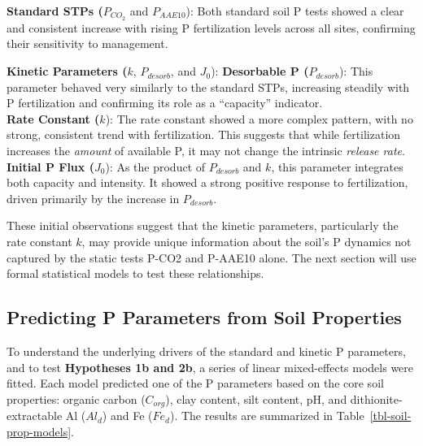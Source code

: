 \documentclass[
  a4paper,
]{article}
\begin{document}
\textbf{Standard STPs (}\(P_{CO_2}\) and \(P_{AAE10}\)): Both standard
soil P tests showed a clear and consistent increase with rising P
fertilization levels across all sites, confirming their sensitivity to
management.

\textbf{Kinetic Parameters (}\(k\), \(P_{desorb}\), and \(J_0\)):
\textbf{Desorbable P (}\(P_{desorb}\)): This parameter behaved very
similarly to the standard STPs, increasing steadily with P fertilization
and confirming its role as a ``capacity'' indicator.\\
\textbf{Rate Constant (}\(k\)): The rate constant showed a more complex
pattern, with no strong, consistent trend with fertilization. This
suggests that while fertilization increases the \emph{amount} of
available P, it may not change the intrinsic \emph{release rate}.
\textbf{Initial P Flux (}\(J_0\)): As the product of \(P_{desorb}\) and
\(k\), this parameter integrates both capacity and intensity. It showed
a strong positive response to fertilization, driven primarily by the
increase in \(P_{desorb}\).

These initial observations suggest that the kinetic parameters,
particularly the rate constant \(k\), may provide unique information
about the soil's P dynamics not captured by the static tests P-CO2 and
P-AAE10 alone. The next section will use formal statistical models to
test these relationships.

\subsection{Predicting P Parameters from Soil
Properties}\label{sec-p-params-soil-props}

To understand the underlying drivers of the standard and kinetic P
parameters, and to test \textbf{Hypotheses 1b and 2b}, a series of
linear mixed-effects models were fitted. Each model predicted one of the
P parameters based on the core soil properties: organic carbon
(\(C_{org}\)), clay content, silt content, pH, and
dithionite-extractable Al (\(Al_d\)) and Fe (\(Fe_d\)). The results are
summarized in Table~\ref{tbl-soil-prop-models}.
\end{document}
